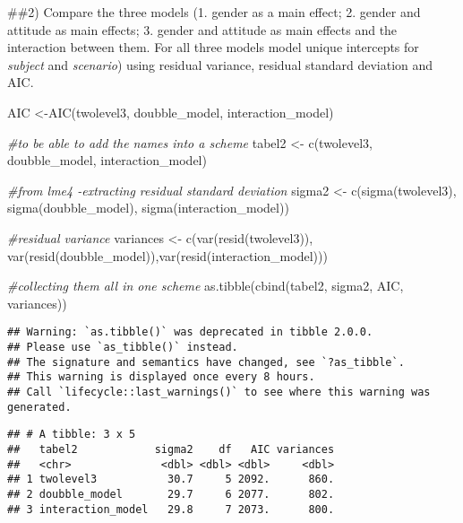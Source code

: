 \documentclass[
]{article}
\newenvironment{Shaded}{\begin{snugshade}}{\end{snugshade}}
\newcommand{\CommentTok}[1]{\textcolor[rgb]{0.56,0.35,0.01}{\textit{#1}}}
\newcommand{\FunctionTok}[1]{\textcolor[rgb]{0.00,0.00,0.00}{#1}}
\newcommand{\NormalTok}[1]{#1}
\newcommand{\OtherTok}[1]{\textcolor[rgb]{0.56,0.35,0.01}{#1}}
\newcommand{\StringTok}[1]{\textcolor[rgb]{0.31,0.60,0.02}{#1}}
\begin{document}
\#\#2) Compare the three models (1. gender as a main effect; 2. gender
and attitude as main effects; 3. gender and attitude as main effects and
the interaction between them. For all three models model unique
intercepts for \emph{subject} and \emph{scenario}) using residual
variance, residual standard deviation and AIC.

\begin{Shaded}
\begin{Highlighting}[]
\NormalTok{AIC }\OtherTok{\textless{}{-}}\FunctionTok{AIC}\NormalTok{(twolevel3, doubble\_model, interaction\_model)}

\CommentTok{\#to be able to add the names into a scheme }
\NormalTok{tabel2 }\OtherTok{\textless{}{-}} \FunctionTok{c}\NormalTok{(}\StringTok{\textquotesingle{}twolevel3\textquotesingle{}}\NormalTok{, }\StringTok{\textquotesingle{}doubble\_model\textquotesingle{}}\NormalTok{, }\StringTok{\textquotesingle{}interaction\_model\textquotesingle{}}\NormalTok{)}

\CommentTok{\#from lme4 {-}extracting residual standard deviation }
\NormalTok{sigma2 }\OtherTok{\textless{}{-}} \FunctionTok{c}\NormalTok{(}\FunctionTok{sigma}\NormalTok{(twolevel3), }\FunctionTok{sigma}\NormalTok{(doubble\_model), }\FunctionTok{sigma}\NormalTok{(interaction\_model))}

\CommentTok{\#residual variance}
\NormalTok{variances }\OtherTok{\textless{}{-}} \FunctionTok{c}\NormalTok{(}\FunctionTok{var}\NormalTok{(}\FunctionTok{resid}\NormalTok{(twolevel3)), }\FunctionTok{var}\NormalTok{(}\FunctionTok{resid}\NormalTok{(doubble\_model)),}\FunctionTok{var}\NormalTok{(}\FunctionTok{resid}\NormalTok{(interaction\_model)))}

\CommentTok{\#collecting them all in one scheme }
\FunctionTok{as.tibble}\NormalTok{(}\FunctionTok{cbind}\NormalTok{(tabel2, sigma2, AIC, variances))}
\end{Highlighting}
\end{Shaded}

\begin{verbatim}
## Warning: `as.tibble()` was deprecated in tibble 2.0.0.
## Please use `as_tibble()` instead.
## The signature and semantics have changed, see `?as_tibble`.
## This warning is displayed once every 8 hours.
## Call `lifecycle::last_warnings()` to see where this warning was generated.
\end{verbatim}

\begin{verbatim}
## # A tibble: 3 x 5
##   tabel2            sigma2    df   AIC variances
##   <chr>              <dbl> <dbl> <dbl>     <dbl>
## 1 twolevel3           30.7     5 2092.      860.
## 2 doubble_model       29.7     6 2077.      802.
## 3 interaction_model   29.8     7 2073.      800.
\end{verbatim}
\end{document}
